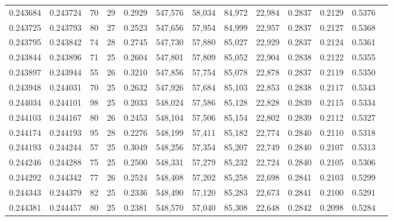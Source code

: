 \begin{tabular}{rrrrrrrrrrrrr}
0.243684 & 0.243724 &  70 &  29 &                                     0.2929 & 547,576 &  58,034 &  84,972 &  22,984 & 0.2837 & 0.2129 & 0.5376 \\
0.243725 & 0.243793 &  80 &  27 &                                     0.2523 & 547,656 &  57,954 &  84,999 &  22,957 & 0.2837 & 0.2127 & 0.5368 \\
0.243795 & 0.243842 &  74 &  28 &                                     0.2745 & 547,730 &  57,880 &  85,027 &  22,929 & 0.2837 & 0.2124 & 0.5361 \\
0.243844 & 0.243896 &  71 &  25 &                                     0.2604 & 547,801 &  57,809 &  85,052 &  22,904 & 0.2838 & 0.2122 & 0.5355 \\
0.243897 & 0.243944 &  55 &  26 &                                     0.3210 & 547,856 &  57,754 &  85,078 &  22,878 & 0.2837 & 0.2119 & 0.5350 \\
0.243948 & 0.244031 &  70 &  25 &                                     0.2632 & 547,926 &  57,684 &  85,103 &  22,853 & 0.2838 & 0.2117 & 0.5343 \\
0.244034 & 0.244101 &  98 &  25 &                                     0.2033 & 548,024 &  57,586 &  85,128 &  22,828 & 0.2839 & 0.2115 & 0.5334 \\
0.244103 & 0.244167 &  80 &  26 &                                     0.2453 & 548,104 &  57,506 &  85,154 &  22,802 & 0.2839 & 0.2112 & 0.5327 \\
0.244174 & 0.244193 &  95 &  28 &                                     0.2276 & 548,199 &  57,411 &  85,182 &  22,774 & 0.2840 & 0.2110 & 0.5318 \\
0.244193 & 0.244244 &  57 &  25 &                                     0.3049 & 548,256 &  57,354 &  85,207 &  22,749 & 0.2840 & 0.2107 & 0.5313 \\
0.244246 & 0.244288 &  75 &  25 &                                     0.2500 & 548,331 &  57,279 &  85,232 &  22,724 & 0.2840 & 0.2105 & 0.5306 \\
0.244292 & 0.244342 &  77 &  26 &                                     0.2524 & 548,408 &  57,202 &  85,258 &  22,698 & 0.2841 & 0.2103 & 0.5299 \\
0.244343 & 0.244379 &  82 &  25 &                                     0.2336 & 548,490 &  57,120 &  85,283 &  22,673 & 0.2841 & 0.2100 & 0.5291 \\
0.244381 & 0.244457 &  80 &  25 &                                     0.2381 & 548,570 &  57,040 &  85,308 &  22,648 & 0.2842 & 0.2098 & 0.5284 \\

\end{tabular}
